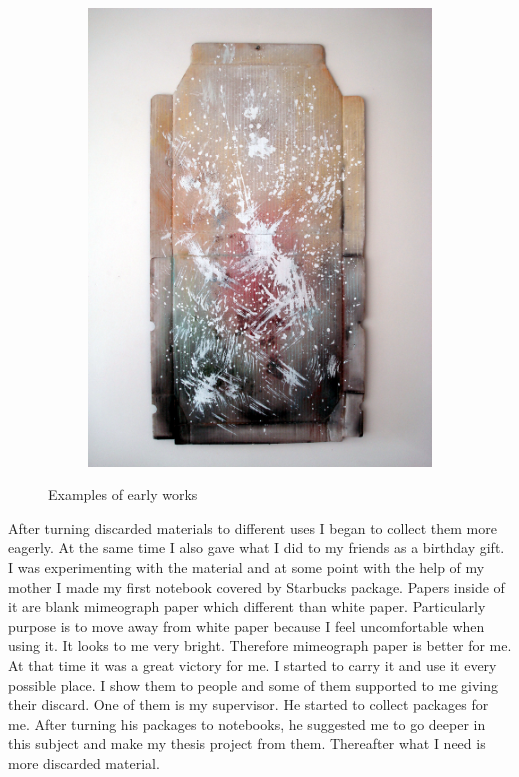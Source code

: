 \begin{figure}
\begin{subfigure}[b]{0.30\textwidth}
        \includegraphics[width=\textwidth]{project_graphics/early_works3.jpg}
    \end{subfigure}
    \caption{Examples of early works}
    \label{fig:EarlyWorks}
\end{figure}

After turning discarded materials to different uses I began to collect them more eagerly. At the same time I also gave what I did to my friends as a birthday gift. I was experimenting with the material and at some point with the help of my mother I made my first notebook covered by Starbucks package. Papers inside of it are blank mimeograph paper which different than white paper. Particularly purpose is to move away from white paper because I feel uncomfortable when using it. It looks to me very bright. Therefore mimeograph paper is better for me. At that time it was a great victory for me. I started to carry it and use it every possible place. I show them to people and some of them supported to me giving their discard. One of them is my supervisor. He started to collect packages for me. After turning his packages to notebooks, he suggested me to go deeper in this subject and make my thesis project from them. Thereafter what I need is more discarded material.

